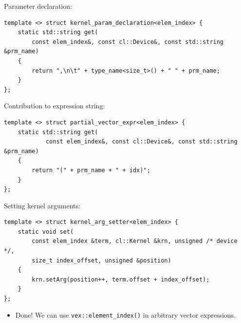 \documentclass[@BEAMER_OPTIONS@]{beamer}
\newcommand{\code}[1]{\lstinline|#1|}
\begin{document}
\note{ }

\begin{frame}[fragile]
    \begin{exampleblock}{Parameter declaration:}
        \begin{lstlisting}
template <> struct kernel_param_declaration<elem_index> {
    static std::string get(
        const elem_index&, const cl::Device&, const std::string &prm_name)
    {
        return ",\n\t" + type_name<size_t>() + " " + prm_name;
    }
};
        \end{lstlisting}
    \end{exampleblock}
    \vspace{0.5\baselineskip}
    \begin{exampleblock}{Contribution to expression string:}
            \begin{lstlisting}
template <> struct partial_vector_expr<elem_index> {
    static std::string get(
            const elem_index&, const cl::Device&, const std::string &prm_name)
    {
        return "(" + prm_name + " + idx)";
    }
};
            \end{lstlisting}
    \end{exampleblock}
\end{frame}

\note{ }

\begin{frame}[fragile]
    \begin{exampleblock}{Setting kernel arguments:}
        \begin{lstlisting}
template <> struct kernel_arg_setter<elem_index> {
    static void set(
        const elem_index &term, cl::Kernel &krn, unsigned /* device */,
        size_t index_offset, unsigned &position)
    {
        krn.setArg(position++, term.offset + index_offset);
    }
};
        \end{lstlisting}
    \end{exampleblock}
    \vspace{\baselineskip}
    \begin{itemize}
        \item Done! We can use \code{vex::element_index()} in arbitrary
            vector expressions.
    \end{itemize}
\end{frame}

\note{}
\end{document}
